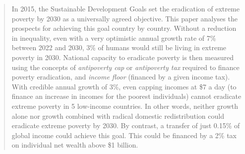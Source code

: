 \begin{abstract}
In 2015, the Sustainable Development Goals set the eradication of extreme poverty by 2030 as a universally agreed objective. This paper analyses the prospects for achieving this goal country by country. Without a reduction in inequality, even with a very optimistic annual growth rate of 7\% between 2022 and 2030, 3\% of humans would still be living in extreme poverty in 2030. National capacity to eradicate poverty is then measured using the concepts of \textit{antipoverty cap} or \textit{antipoverty tax} required to finance poverty eradication, and \textit{income floor} (financed by a given income tax). With credible annual growth of 3\%, even capping incomes at \$7 a day (to finance an increase in incomes for the poorest individuals) cannot eradicate extreme poverty in 5 low-income countries. In other words, neither growth alone nor growth combined with radical domestic redistribution could eradicate extreme poverty by 2030. By contrast, a transfer of just 0.15\% of global income could achieve this goal. This could be financed by a 2\% tax on individual net wealth above \$1 billion.

\end{abstract}


\clearpage
\tableofcontents


